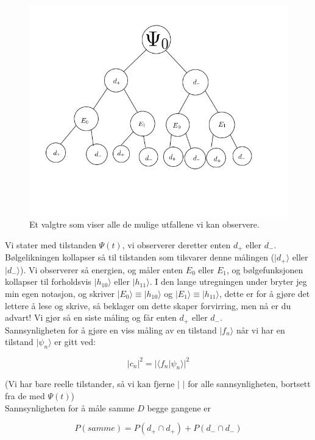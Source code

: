 \documentclass[a4paper,norsk, 10pt]{article}
\numberwithin{equation}{section}
\begin{document}
\begin{figure}[H]
\centering
\includegraphics[scale=0.6]{3c.png}
\caption{Et valgtre som viser alle de mulige utfallene vi kan observere.}
\end{figure}

Vi stater med tilstanden $\Psi(t)$, vi observerer deretter enten $d_+$ eller $d_-$. Bølgelikningen kollapser så til tilstanden som tilsvarer denne målingen ($|d_+\rangle$ eller $|d_-\rangle$). Vi observerer så energien, og måler enten $E_0$ eller $E_1$, og bølgefunksjonen kollapser til forholdsvis $|h_{10}\rangle$ eller $|h_{11}\rangle$. I den lange utregningen under bryter jeg min egen notasjon, og skriver $|E_0\rangle \equiv |h_{10}\rangle $ og $|E_1\rangle \equiv |h_{11}\rangle $, dette er for å gjøre det lettere å lese og skrive, så beklager om dette skaper forvirring, men nå er du advart! Vi gjør så en siste måling og får enten $d_+$ eller $d_-$.\\

Sannsynligheten for å gjøre en viss måling av en tilstand $| f_n\rangle$ når vi har en tilstand $|\psi_n\rangle$ er gitt ved:

$$
|c_n|^2 = |\langle f_n|\psi_n\rangle|^2
$$

(Vi har bare reelle tilstander, så vi kan fjerne $|$ $|$ for alle sannsynligheten, bortsett fra de med $\Psi(t)$)\\

Sannsynligheten for å måle samme $D$ begge gangene er

\begin{equation}
P(samme) = P(d_+ \cap d_+) + P(d_- \cap d_-)
\label{eq:Psamme}
\end{equation}
\end{document}
